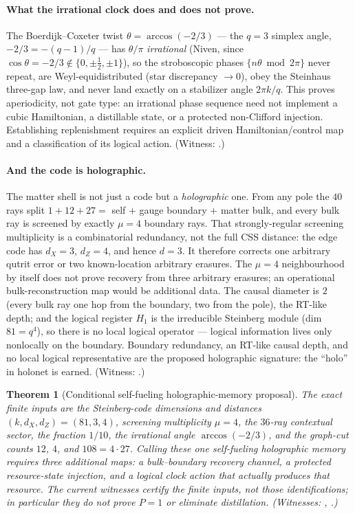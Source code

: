 \documentclass[11pt]{article}
\newtheorem{theorem}{Theorem}[section]
\begin{document}
\paragraph{What the irrational clock does and does not prove.} The Boerdijk--Coxeter twist
$\theta=\arccos(-2/3)$ --- the $q=3$ simplex angle, $-2/3=-(q-1)/q$ --- has $\theta/\pi$
\emph{irrational} (Niven, since $\cos\theta=-2/3\notin\{0,\pm\tfrac12,\pm1\}$), so the
stroboscopic phases $\{n\theta\bmod2\pi\}$ never repeat, are Weyl-equidistributed (star
discrepancy $\to0$), obey the Steinhaus three-gap law, and never land exactly on a
stabilizer angle $2\pi k/q$.  This proves aperiodicity, not gate type:
an irrational phase sequence need not implement a cubic Hamiltonian, a
distillable state, or a protected non-Clifford injection.  Establishing
replenishment requires an explicit driven Hamiltonian/control map and a
classification of its logical action. (Witness:
.)

\paragraph{And the code is holographic.} The matter shell is not just a code but a
\emph{holographic} one. From any pole the $40$ rays split $1+12+27=$ self $+$ gauge
boundary $+$ matter bulk, and every bulk ray is screened by exactly $\mu=4$ boundary
rays.  That strongly-regular screening multiplicity is a combinatorial redundancy,
not the full CSS distance: the edge code has $d_X=3$, $d_Z=4$, and hence $d=3$.
It therefore corrects one arbitrary qutrit error or two known-location arbitrary
erasures.  The $\mu=4$ neighbourhood by itself does not prove recovery from three
arbitrary erasures; an operational bulk-reconstruction map would be additional data. The causal
diameter is $2$ (every bulk ray one hop from the boundary, two from the pole), the
RT-like depth; and the logical register $H_1$ is the irreducible Steinberg module
(dim $81=q^4$), so there is no local logical operator --- logical information lives only
nonlocally on the boundary. Boundary redundancy, an RT-like causal depth, and no local
logical representative are the proposed holographic signature:
the ``holo'' in holonet is earned. (Witness:
.)

\begin{theorem}[Conditional self-fueling holographic-memory proposal]
The exact finite inputs are the Steinberg-code dimensions and distances
$(k,d_X,d_Z)=(81,3,4)$, screening multiplicity $\mu=4$, the
$36$-ray contextual sector, the fraction $1/10$, the irrational angle
$\arccos(-2/3)$, and the graph-cut counts $12$, $4$, and
$108=4\cdot27$.  Calling these one self-fueling holographic memory requires
three additional maps: a bulk--boundary recovery channel, a protected
resource-state injection, and a logical clock action that actually produces
that resource.  The current witnesses certify the finite inputs, not those
identifications; in particular they do not prove $P=1$ or eliminate
distillation. (Witnesses: ,
.)
\end{theorem}
\end{document}
